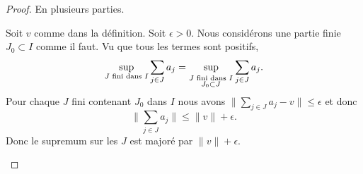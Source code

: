\begin{proof}
	En plusieurs parties.
	\begin{subproof}
		Soit \( v\) comme dans la définition. Soit \( \epsilon>0\). Nous considérons une partie finie \( J_0\subset I\) comme il faut. Vu que tous les termes sont positifs,
		\begin{equation}
			\sup_{\text{\( J\) fini dans \( I\)}}\sum_{j\in J}a_j=\sup_{_{\substack{\text{\( J\) fini dans \( I\)}\\J_0\subset J}}}\sum_{j\in J}a_j.
		\end{equation}
		Pour chaque \( J\) fini contenant \( J_0\) dans \( I\) nous avons \( \| \sum_{j\in J}a_j-v \|\leq\epsilon\) et donc
		\begin{equation}
			\| \sum_{j\in J}a_j \|\leq \| v \|+\epsilon.
		\end{equation}
		Donc le supremum sur les \( J\) est majoré par \( \| v \|+\epsilon\).


\end{subproof}
\end{proof}
